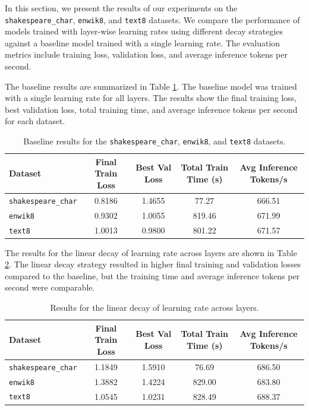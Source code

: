 \documentclass{article} %
\begin{document}
In this section, we present the results of our experiments on the \texttt{shakespeare\_char}, \texttt{enwik8}, and \texttt{text8} datasets. We compare the performance of models trained with layer-wise learning rates using different decay strategies against a baseline model trained with a single learning rate. The evaluation metrics include training loss, validation loss, and average inference tokens per second.

The baseline results are summarized in Table \ref{tab:baseline-results}. The baseline model was trained with a single learning rate for all layers. The results show the final training loss, best validation loss, total training time, and average inference tokens per second for each dataset.

\begin{table}[h]
    \centering
    \begin{tabular}{lcccc}
        \toprule
        Dataset & Final Train Loss & Best Val Loss & Total Train Time (s) & Avg Inference Tokens/s \\
        \midrule
        \texttt{shakespeare\_char} & 0.8186 & 1.4655 & 77.27 & 666.51 \\
        \texttt{enwik8} & 0.9302 & 1.0055 & 819.46 & 671.99 \\
        \texttt{text8} & 1.0013 & 0.9800 & 801.22 & 671.57 \\
        \bottomrule
    \end{tabular}
    \caption{Baseline results for the \texttt{shakespeare\_char}, \texttt{enwik8}, and \texttt{text8} datasets.}
    \label{tab:baseline-results}
\end{table}

The results for the linear decay of learning rate across layers are shown in Table \ref{tab:linear-decay-results}. The linear decay strategy resulted in higher final training and validation losses compared to the baseline, but the training time and average inference tokens per second were comparable.

\begin{table}[h]
    \centering
    \begin{tabular}{lcccc}
        \toprule
        Dataset & Final Train Loss & Best Val Loss & Total Train Time (s) & Avg Inference Tokens/s \\
        \midrule
        \texttt{shakespeare\_char} & 1.1849 & 1.5910 & 76.69 & 686.50 \\
        \texttt{enwik8} & 1.3882 & 1.4224 & 829.00 & 683.80 \\
        \texttt{text8} & 1.0545 & 1.0231 & 828.49 & 688.37 \\
        \bottomrule
    \end{tabular}
    \caption{Results for the linear decay of learning rate across layers.}
    \label{tab:linear-decay-results}
\end{table}
\end{document}
